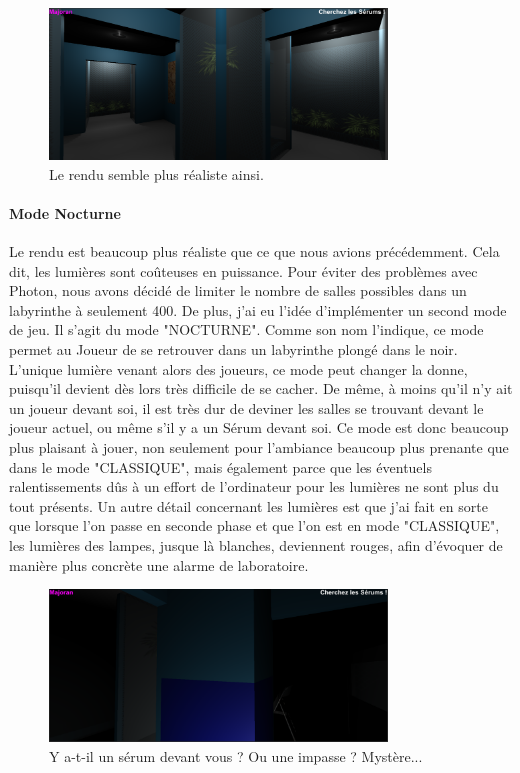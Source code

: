 \documentclass{article}
\begin{document}
\begin{figure}[H]
    \centering
    \includegraphics[width=0.8\textwidth]{Lumieres.png}
    \caption{Le rendu semble plus réaliste ainsi.}
    \label{Le rendu semble plus réaliste ainsi.}
\end{figure}

\paragraph{Mode Nocturne}
Le rendu est beaucoup plus réaliste que ce que nous avions précédemment. Cela dit, les lumières sont coûteuses en puissance. Pour éviter des problèmes avec Photon, nous avons décidé de limiter le nombre de salles possibles dans un labyrinthe à seulement 400. De plus, j'ai eu l'idée d'implémenter un second mode de jeu. Il s'agit du mode "NOCTURNE". Comme son nom l'indique, ce mode permet au Joueur de se retrouver dans un labyrinthe plongé dans le noir. L'unique lumière venant alors des joueurs, ce mode peut changer la donne, puisqu'il devient dès lors très difficile de se cacher. De même, à moins qu'il n'y ait un joueur devant soi, il est très dur de deviner les salles se trouvant devant le joueur actuel, ou même s'il y a un Sérum devant soi. Ce mode est donc beaucoup plus plaisant à jouer, non seulement pour l'ambiance beaucoup plus prenante que dans le mode "CLASSIQUE", mais également parce que les éventuels ralentissements dûs à un effort de l'ordinateur pour les lumières ne sont plus du tout présents. Un autre détail concernant les lumières est que j'ai fait en sorte que lorsque l'on passe en seconde phase et que l'on est en mode "CLASSIQUE", les lumières des lampes, jusque là blanches, deviennent rouges, afin d'évoquer de manière plus concrète une alarme de laboratoire.

\begin{figure}[H]
    \centering
    \includegraphics[width=0.8\textwidth]{Nocturne.png}
    \caption{Y a-t-il un sérum devant vous ? Ou une impasse ? Mystère...}
    \label{Y a-t-il un sérum devant vous ? Ou une impasse ? Mystère...}
\end{figure}
\end{document}
